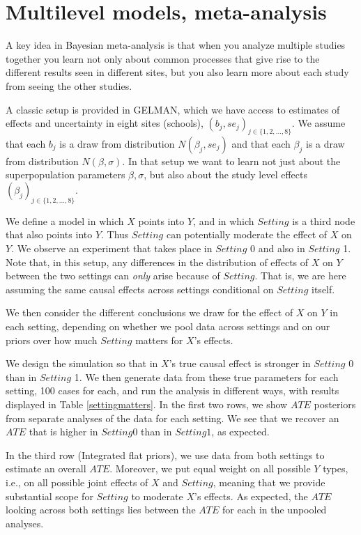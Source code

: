 \documentclass[
  12pt,
]{book}
\begin{document}
\hypertarget{multilevel-models-meta-analysis}{%
\section{Multilevel models, meta-analysis}\label{multilevel-models-meta-analysis}}

A key idea in Bayesian meta-analysis is that when you analyze multiple studies together you learn not only about common processes that give rise to the different results seen in different sites, but you also learn more about each study from seeing the other studies.

A classic setup is provided in GELMAN, which we have access to estimates of effects and uncertainty in eight sites (schools), \((b_j, se_j)_{j \in \{1,2,\dots,8\}}\). We assume that each \(b_j\) is a draw from distribution \(N(\beta_j, se_j)\) and that each \(\beta_j\) is a draw from distribution \(N(\beta, \sigma)\). In that setup we want to learn not just about the superpopulation parameters \(\beta, \sigma\), but also about the study level effects \((\beta_j)_{j \in \{1,2,\dots,8\}}\).

We define a model in which \(X\) points into \(Y\), and in which \(Setting\) is a third node that also points into \(Y\). Thus \(Setting\) can potentially moderate the effect of \(X\) on \(Y\). We observe an experiment that takes place in \(Setting\) 0 and also in \(Setting\) 1. Note that, in this setup, any differences in the distribution of effects of \(X\) on \(Y\) between the two settings can \emph{only} arise because of \(Setting\). That is, we are here assuming the same causal effects across settings conditional on \(Setting\) itself.

We then consider the different conclusions we draw for the effect of \(X\) on \(Y\) in each setting, depending on whether we pool data across settings and on our priors over how much \(Setting\) matters for \(X\)'s effects.

We design the simulation so that in \(X\)'s true causal effect is stronger in \(Setting\) 0 than in \(Setting\) 1. We then generate data from these true parameters for each setting, 100 cases for each, and run the analysis in different ways, with results displayed in Table \ref{settingmatters}. In the first two rows, we show \(ATE\) posteriors from separate analyses of the data for each setting. We see that we recover an \(ATE\) that is higher in \(Setting 0\) than in \(Setting 1\), as expected.

In the third row (Integrated flat priors), we use data from both settings to estimate an overall \(ATE\). Moreover, we put equal weight on all possible \(Y\) types, i.e., on all possible joint effects of \(X\) and \(Setting\), meaning that we provide substantial scope for \(Setting\) to moderate \(X\)'s effects. As expected, the \(ATE\) looking across both settings lies between the \(ATE\) for each in the unpooled analyses.
\end{document}
